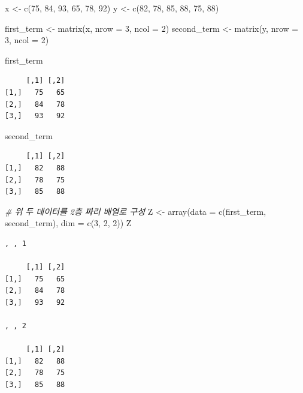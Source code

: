 \documentclass[
  11pt,
]{krantz}
\newenvironment{Shaded}{\begin{snugshade}}{\end{snugshade}}
\newcommand{\AttributeTok}[1]{\textcolor[rgb]{0.61,0.61,0.61}{#1}}
\newcommand{\CommentTok}[1]{\textcolor[rgb]{0.37,0.37,0.37}{\textit{#1}}}
\newcommand{\DecValTok}[1]{\textcolor[rgb]{0.06,0.06,0.06}{#1}}
\newcommand{\FunctionTok}[1]{\textcolor[rgb]{0,0,0}{#1}}
\newcommand{\NormalTok}[1]{#1}
\newcommand{\OtherTok}[1]{\textcolor[rgb]{0.37,0.37,0.37}{#1}}
\begin{document}
\begin{Shaded}
\begin{Highlighting}[]
\NormalTok{x }\OtherTok{\textless{}{-}} \FunctionTok{c}\NormalTok{(}\DecValTok{75}\NormalTok{, }\DecValTok{84}\NormalTok{, }\DecValTok{93}\NormalTok{, }\DecValTok{65}\NormalTok{, }\DecValTok{78}\NormalTok{, }\DecValTok{92}\NormalTok{)}
\NormalTok{y }\OtherTok{\textless{}{-}} \FunctionTok{c}\NormalTok{(}\DecValTok{82}\NormalTok{, }\DecValTok{78}\NormalTok{, }\DecValTok{85}\NormalTok{, }\DecValTok{88}\NormalTok{, }\DecValTok{75}\NormalTok{, }\DecValTok{88}\NormalTok{)}

\NormalTok{first\_term }\OtherTok{\textless{}{-}} \FunctionTok{matrix}\NormalTok{(x, }\AttributeTok{nrow =} \DecValTok{3}\NormalTok{, }\AttributeTok{ncol =} \DecValTok{2}\NormalTok{)}
\NormalTok{second\_term }\OtherTok{\textless{}{-}} \FunctionTok{matrix}\NormalTok{(y, }\AttributeTok{nrow =} \DecValTok{3}\NormalTok{, }\AttributeTok{ncol =} \DecValTok{2}\NormalTok{)}

\NormalTok{first\_term}
\end{Highlighting}
\end{Shaded}

\begin{verbatim}
     [,1] [,2]
[1,]   75   65
[2,]   84   78
[3,]   93   92
\end{verbatim}

\begin{Shaded}
\begin{Highlighting}[]
\NormalTok{second\_term}
\end{Highlighting}
\end{Shaded}

\begin{verbatim}
     [,1] [,2]
[1,]   82   88
[2,]   78   75
[3,]   85   88
\end{verbatim}

\begin{Shaded}
\begin{Highlighting}[]
\CommentTok{\# 위 두 데이터를 2층 짜리 배열로 구성}
\NormalTok{Z }\OtherTok{\textless{}{-}} \FunctionTok{array}\NormalTok{(}\AttributeTok{data =} \FunctionTok{c}\NormalTok{(first\_term, second\_term), }
           \AttributeTok{dim =} \FunctionTok{c}\NormalTok{(}\DecValTok{3}\NormalTok{, }\DecValTok{2}\NormalTok{, }\DecValTok{2}\NormalTok{))}
\NormalTok{Z}
\end{Highlighting}
\end{Shaded}

\begin{verbatim}
, , 1

     [,1] [,2]
[1,]   75   65
[2,]   84   78
[3,]   93   92

, , 2

     [,1] [,2]
[1,]   82   88
[2,]   78   75
[3,]   85   88
\end{verbatim}
\end{document}
